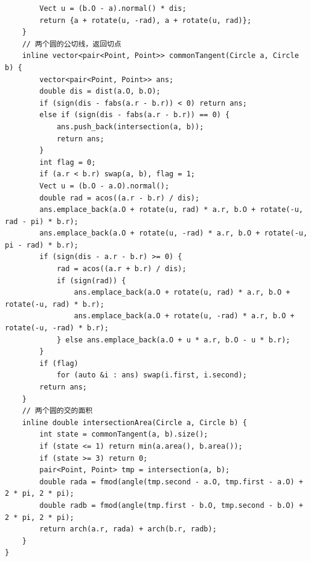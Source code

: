 \begin{verbatim}
        Vect u = (b.O - a).normal() * dis;
        return {a + rotate(u, -rad), a + rotate(u, rad)};
    }
    // 两个圆的公切线，返回切点
    inline vector<pair<Point, Point>> commonTangent(Circle a, Circle b) {
        vector<pair<Point, Point>> ans;
        double dis = dist(a.O, b.O);
        if (sign(dis - fabs(a.r - b.r)) < 0) return ans;
        else if (sign(dis - fabs(a.r - b.r)) == 0) {
            ans.push_back(intersection(a, b));
            return ans;
        }
        int flag = 0;
        if (a.r < b.r) swap(a, b), flag = 1;
        Vect u = (b.O - a.O).normal();
        double rad = acos((a.r - b.r) / dis);
        ans.emplace_back(a.O + rotate(u, rad) * a.r, b.O + rotate(-u, rad - pi) * b.r);
        ans.emplace_back(a.O + rotate(u, -rad) * a.r, b.O + rotate(-u, pi - rad) * b.r);
        if (sign(dis - a.r - b.r) >= 0) {
            rad = acos((a.r + b.r) / dis);
            if (sign(rad)) {
                ans.emplace_back(a.O + rotate(u, rad) * a.r, b.O + rotate(-u, rad) * b.r);
                ans.emplace_back(a.O + rotate(u, -rad) * a.r, b.O + rotate(-u, -rad) * b.r);
            } else ans.emplace_back(a.O + u * a.r, b.O - u * b.r);
        }
        if (flag)
            for (auto &i : ans) swap(i.first, i.second);
        return ans;
    }
    // 两个圆的交的面积
    inline double intersectionArea(Circle a, Circle b) {
        int state = commonTangent(a, b).size();
        if (state <= 1) return min(a.area(), b.area());
        if (state >= 3) return 0;
        pair<Point, Point> tmp = intersection(a, b);
        double rada = fmod(angle(tmp.second - a.O, tmp.first - a.O) + 2 * pi, 2 * pi);
        double radb = fmod(angle(tmp.first - b.O, tmp.second - b.O) + 2 * pi, 2 * pi);
        return arch(a.r, rada) + arch(b.r, radb);
    }
}
\end{verbatim}